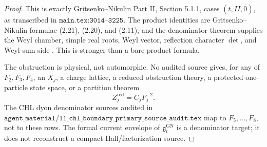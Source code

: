 \begin{proof}
This is exactly Gritsenko--Nikulin Part II, Section 5.1.1, cases
\((t,II,\overline0)\), as transcribed in
\(\texttt{main.tex:3014--3225}\).  The product identities are
Gritsenko--Nikulin formulae (2.21), (2.20), and (2.11), and the
denominator theorem supplies the Weyl chamber, simple real roots, Weyl
vector, reflection character \(\det\), and Weyl-sum side \cite{GNII}.
This is stronger than a bare product formula.

The obstruction is physical, not automorphic.  No audited source gives,
for any of \(F_2,F_3,F_4\), an \(X_j\), a charge lattice, a reduced
obstruction theory, a protected one-particle state space, or a
partition theorem
\[
Z_j^{\mathrm{red}}=C_jF_j^{-2}.
\]
The CHL dyon denominator sources audited in
\(\texttt{agent\_material/11\_chl\_boundary\_primary\_source\_audit.tex}\)
map to \(F_5,\ldots,F_8\), not to these rows.  The formal current
envelope of \(\mathfrak g^{\mathrm{GN}}_t\) is a denominator target; it
does not reconstruct a compact Hall/factorization source.
\end{proof}

